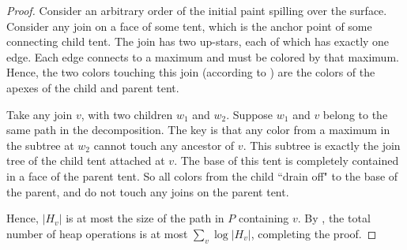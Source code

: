 {\begin{proof}
 Consider an arbitrary order of the initial paint spilling over the surface.
 Consider any join on a face of some tent, which is the anchor point of some connecting child tent.  
 The join has two up-stars, each of which has exactly one edge. Each edge connects to a maximum
 and must be colored by that maximum.
 Hence, the two colors touching this join (according to )
 are the colors of the apexes of the child and parent tent.  
% 
 
 Take any join $v$, with two children $w_1$ and $w_2$. Suppose $w_1$ and $v$ belong to the same path
 in the decomposition. The key is that any color from a maximum in the subtree at $w_2$ cannot touch
 any ancestor of $v$. This subtree is exactly the join tree of the child tent attached at $v$.
 The base of this tent is completely contained in a face of the parent tent. So all colors
 from the child ``drain off" to the base of the parent, and do not touch any joins on the parent tent.
 
 Hence, $|H_v|$ is at most the size of the path in $P$ containing $v$. By , the total number of heap operations
 is at most $\sum_v \log |H_v|$, completing the proof.
 
% 
\end{proof}

}
